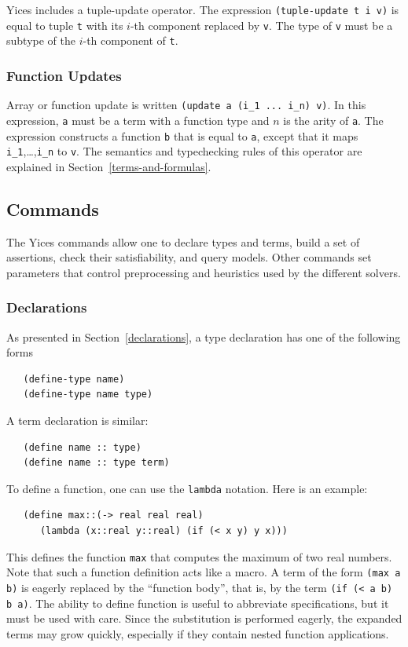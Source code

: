 \documentclass[11pt,twoside,fleqn,openright,titlepage]{cslreport}
\begin{document}
\medskip\noindent Yices includes a tuple-update operator. The expression
\texttt{(tuple-update t i v)} is equal to tuple \texttt{t} with its $i$-th
component replaced by \texttt{v}. The type of \texttt{v} must be a subtype of
the $i$-th component of \texttt{t}.

\subsubsection*{Function Updates}

Array or function update is written \texttt{(update a (i\_1 ... i\_n)
  v)}. In this expression, \texttt{a} must be a term with a function
type and $n$ is the arity of \texttt{a}. The expression constructs a
function \texttt{b} that is equal to \texttt{a}, except that it maps
\texttt{i\_1},\ldots,\texttt{i\_n} to \texttt{v}.  The semantics and
typechecking rules of this operator are explained in
Section~\ref{terms-and-formulas}.


\subsection{Commands}

The Yices commands allow one to  declare types and terms, build a set
of  assertions, check  their  satisfiability, and  query models.  Other
commands set parameters that control preprocessing and heuristics used
by the different solvers.

\subsubsection*{Declarations}

As presented in Section~\ref{declarations}, a type declaration has one
of the following forms
\begin{small}
\begin{verbatim}
   (define-type name)
   (define-type name type)
\end{verbatim}
\end{small}
A term declaration is similar:
\begin{small}
\begin{verbatim}
   (define name :: type)
   (define name :: type term)
\end{verbatim}
\end{small}
To define a function, one can use the \texttt{lambda} notation.  Here
is an example:
\begin{small}
\begin{verbatim}
   (define max::(-> real real real)
      (lambda (x::real y::real) (if (< x y) y x)))
\end{verbatim}
\end{small}
This defines the function \texttt{max} that computes the maximum of
two real numbers. Note that such a function definition acts like a
macro. A term of the form \texttt{(max a b)} is eagerly replaced by
the ``function body'', that is, by the term \texttt{(if (< a b) b a)}.
The ability to define function is useful to abbreviate specifications,
but it must be used with care. Since the substitution is performed
eagerly, the expanded terms may grow quickly, especially if they
contain nested function applications.
\end{document}
